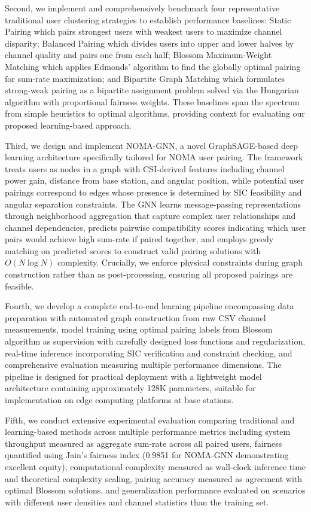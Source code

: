 Second, we implement and comprehensively benchmark four representative traditional user clustering strategies to establish performance baselines: Static Pairing which pairs strongest users with weakest users to maximize channel disparity; Balanced Pairing which divides users into upper and lower halves by channel quality and pairs one from each half; Blossom Maximum-Weight Matching which applies Edmonds' algorithm to find the globally optimal pairing for sum-rate maximization; and Bipartite Graph Matching which formulates strong-weak pairing as a bipartite assignment problem solved via the Hungarian algorithm with proportional fairness weights. These baselines span the spectrum from simple heuristics to optimal algorithms, providing context for evaluating our proposed learning-based approach.

Third, we design and implement NOMA-GNN, a novel GraphSAGE-based deep learning architecture specifically tailored for NOMA user pairing. The framework treats users as nodes in a graph with CSI-derived features including channel power gain, distance from base station, and angular position, while potential user pairings correspond to edges whose presence is determined by SIC feasibility and angular separation constraints. The GNN learns message-passing representations through neighborhood aggregation that capture complex user relationships and channel dependencies, predicts pairwise compatibility scores indicating which user pairs would achieve high sum-rate if paired together, and employs greedy matching on predicted scores to construct valid pairing solutions with $O(N \log N)$ complexity. Crucially, we enforce physical constraints during graph construction rather than as post-processing, ensuring all proposed pairings are feasible.

Fourth, we develop a complete end-to-end learning pipeline encompassing data preparation with automated graph construction from raw CSV channel measurements, model training using optimal pairing labels from Blossom algorithm as supervision with carefully designed loss functions and regularization, real-time inference incorporating SIC verification and constraint checking, and comprehensive evaluation measuring multiple performance dimensions. The pipeline is designed for practical deployment with a lightweight model architecture containing approximately 128K parameters, suitable for implementation on edge computing platforms at base stations.

Fifth, we conduct extensive experimental evaluation comparing traditional and learning-based methods across multiple performance metrics including system throughput measured as aggregate sum-rate across all paired users, fairness quantified using Jain's fairness index (0.9851 for NOMA-GNN demonstrating excellent equity), computational complexity measured as wall-clock inference time and theoretical complexity scaling, pairing accuracy measured as agreement with optimal Blossom solutions, and generalization performance evaluated on scenarios with different user densities and channel statistics than the training set.

